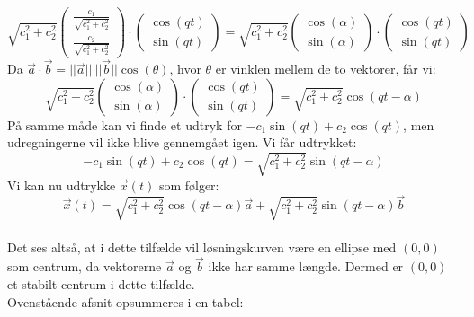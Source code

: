 \begin{equation*}
\sqrt{c_1^2+c_2^2}\begin{pmatrix}
        \frac{c_1}{\sqrt{c_1^2+c_2^2}}\\ \frac{c_2}{\sqrt{c_1^2+c_2^2}}
    \end{pmatrix} \cdot \begin{pmatrix}
        \cos(qt) \\ \sin(qt) 
    \end{pmatrix}=
     \sqrt{c_1^2+c_2^2}\begin{pmatrix}
        \cos(\alpha)\\ 
        \sin(\alpha)
    \end{pmatrix} \cdot \begin{pmatrix}
        \cos(qt) \\ \sin(qt) 
    \end{pmatrix}
\end{equation*}
Da $\vec{a} \cdot \vec{b}= ||\vec{a}|| \ ||\vec{b}||\cos(\theta)$, hvor $\theta$ er vinklen mellem de to vektorer, får vi: 
\begin{equation*}
    \sqrt{c_1^2+c_2^2}\begin{pmatrix}
        \cos(\alpha)\\ 
        \sin(\alpha)
    \end{pmatrix} \cdot \begin{pmatrix}
        \cos(qt) \\ \sin(qt) 
    \end{pmatrix}=\sqrt{c_1^2+c_2^2}\cos(qt-\alpha)
\end{equation*} 
På samme måde kan vi finde et udtryk for $-c_1\sin(qt)+c_2\cos(qt)$, men udregningerne vil ikke blive gennemgået igen. Vi får udtrykket:
\begin{equation*}
    -c_1\sin(qt)+c_2\cos(qt)= \sqrt{c_1^2+c_2^2}\sin(qt-\alpha)
\end{equation*}
Vi kan nu udtrykke $\vec{x}(t)$ som følger:
\begin{equation*}
    \vec{x}(t)=\sqrt{c_1^2+c_2^2}\cos(qt-\alpha)\vec{a}+\sqrt{c_1^2+c_2^2}\sin(qt-\alpha)\vec{b}
\end{equation*}
\\
Det ses altså, at i dette tilfælde vil løsningskurven være en ellipse med $(0,0)$ som centrum, da vektorerne $\vec{a}$ og $\vec{b}$ ikke har samme længde. Dermed er $(0,0)$ et stabilt centrum i dette tilfælde. \\

Ovenstående afsnit opsummeres i en tabel: 

